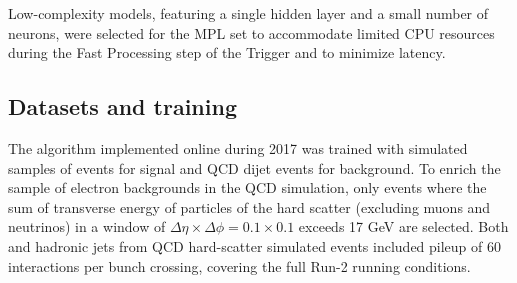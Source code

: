 Low-complexity models, featuring a single hidden layer and a small number of neurons, were selected for the MPL set to accommodate limited CPU resources during the Fast Processing step of the Trigger and to minimize latency. %






\subsection{Datasets and training}

The \rnn{} algorithm implemented online during 2017 was trained with simulated samples of \Zee events for signal and QCD dijet events for background.  To enrich the sample of electron backgrounds in the QCD simulation, only events where the sum of transverse energy of particles of the hard scatter (excluding muons and neutrinos) in a window of $\Delta\eta\times\Delta\phi=0.1\times0.1$  exceeds 17 GeV are selected.
%
%
%
%
Both \Zee and hadronic jets from QCD hard-scatter simulated events included pileup of 60 interactions per bunch crossing, covering the full Run-2 running conditions.



%
%

